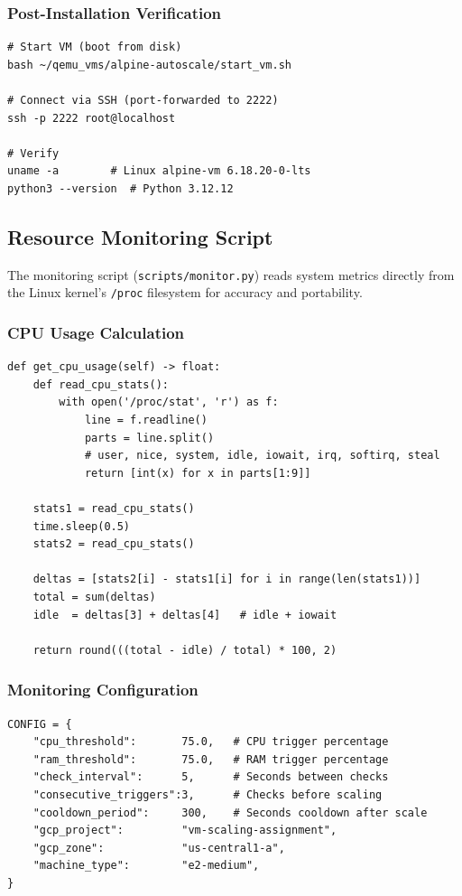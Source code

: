 \documentclass[12pt,a4paper]{article}
\begin{document}
\subsubsection{Post-Installation Verification}

\begin{lstlisting}[style=bashstyle, caption={SSH into installed VM}]
# Start VM (boot from disk)
bash ~/qemu_vms/alpine-autoscale/start_vm.sh

# Connect via SSH (port-forwarded to 2222)
ssh -p 2222 root@localhost

# Verify
uname -a        # Linux alpine-vm 6.18.20-0-lts
python3 --version  # Python 3.12.12
\end{lstlisting}

\subsection{Resource Monitoring Script}

The monitoring script (\texttt{scripts/monitor.py}) reads system metrics directly from the Linux
kernel's \texttt{/proc} filesystem for accuracy and portability.

\subsubsection{CPU Usage Calculation}

\begin{lstlisting}[style=pythonstyle, caption={CPU usage from /proc/stat}]
def get_cpu_usage(self) -> float:
    def read_cpu_stats():
        with open('/proc/stat', 'r') as f:
            line = f.readline()
            parts = line.split()
            # user, nice, system, idle, iowait, irq, softirq, steal
            return [int(x) for x in parts[1:9]]

    stats1 = read_cpu_stats()
    time.sleep(0.5)
    stats2 = read_cpu_stats()

    deltas = [stats2[i] - stats1[i] for i in range(len(stats1))]
    total = sum(deltas)
    idle  = deltas[3] + deltas[4]   # idle + iowait

    return round(((total - idle) / total) * 100, 2)
\end{lstlisting}

\subsubsection{Monitoring Configuration}

\begin{lstlisting}[style=pythonstyle, caption={monitor.py configuration}]
CONFIG = {
    "cpu_threshold":       75.0,   # CPU trigger percentage
    "ram_threshold":       75.0,   # RAM trigger percentage
    "check_interval":      5,      # Seconds between checks
    "consecutive_triggers":3,      # Checks before scaling
    "cooldown_period":     300,    # Seconds cooldown after scale
    "gcp_project":         "vm-scaling-assignment",
    "gcp_zone":            "us-central1-a",
    "machine_type":        "e2-medium",
}
\end{lstlisting}
\end{document}
